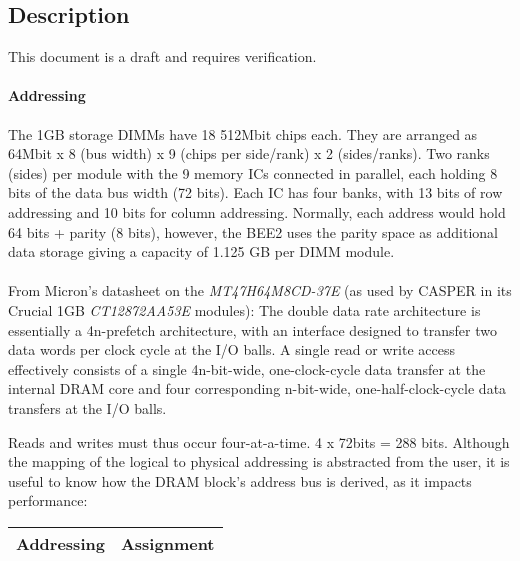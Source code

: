 \documentclass{article}
\newcommand{\BlockDesc}[1]{\subsection*{Description}#1}
\begin{document}
\BlockDesc{



This document is a draft and requires verification.



\paragraph{Addressing}

The 1GB storage DIMMs have 18 512Mbit chips each. They are arranged as 64Mbit x 8 (bus width) x 9 (chips per side/rank) x 2 (sides/ranks). Two ranks (sides) per module with the 9 memory ICs connected in parallel, each holding 8 bits of the data bus width (72 bits). Each IC has four banks, with 13 bits of row addressing and 10 bits for column addressing. Normally, each address would hold 64 bits + parity (8 bits), however, the BEE2 uses the parity space as additional data storage giving a capacity of 1.125 GB per DIMM module.

\paragraph{}

From Micron's datasheet on the \textit{MT47H64M8CD-37E} (as used by CASPER in its Crucial 1GB \textit{CT12872AA53E} modules): The double data rate architecture is essentially a 4n-prefetch architecture, with an interface designed to transfer two data words per clock cycle at the I/O balls. A single read or write access effectively consists of a single 4n-bit-wide, one-clock-cycle data transfer at the internal DRAM core and four corresponding n-bit-wide, one-half-clock-cycle data transfers at the I/O balls.

Reads and writes must thus occur four-at-a-time. 4 x 72bits = 288 bits. Although the mapping of the logical to physical addressing is abstracted from the user, it is useful to know how the DRAM block's address bus is derived, as it impacts performance:



\begin{table*}[h]

	\centering

		\begin{tabular}{|c|c|}

		\hline

			Addressing 	& 	Assignment	\\

			\hline


\end{tabular}
\end{table*}}
\end{document}
